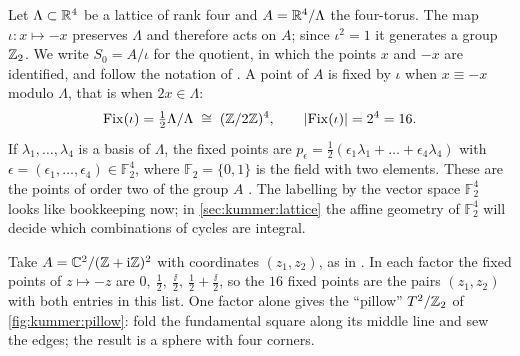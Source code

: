 Let $\Lambda\subset\mathbb{R}^4$ be a lattice of rank four and $A=\mathbb{R}^4/\Lambda$ the four-torus. The map
$\iota\colon x\mapsto -x$ preserves $\Lambda$ and therefore acts on $A$; since
$\iota^2=1$ it generates a group $\mathbb{Z}_2$. We write $S_0=A/\iota$ for the quotient, in which the
points $x$ and $-x$ are identified, and follow the notation of . A point of $A$ is fixed by $\iota$ when $x\equiv-x$ modulo $\Lambda$, that is
when $2x\in\Lambda$:
\begin{equation}\label{eq:kummer:fixed}
  \mathrm{Fix}(\iota)=\tfrac12\Lambda/\Lambda\;\cong\;(\mathbb{Z}/2\mathbb{Z})^4 ,\qquad
  |\mathrm{Fix}(\iota)|=2^4=16 .
\end{equation}
If $\lambda_1,\dots,\lambda_4$ is a basis of $\Lambda$, the fixed points are
$p_\epsilon=\frac12(\epsilon_1\lambda_1+\dots+\epsilon_4\lambda_4)$ with
$\epsilon=(\epsilon_1,\dots,\epsilon_4)\in\mathbb{F}_2^4$, where $\mathbb{F}_2=\{0,1\}$ is the
field with two elements. These are the points of order two of the group $A$
. The labelling by the vector space
$\mathbb{F}_2^4$ looks like bookkeeping now; in
\cref{sec:kummer:lattice} the affine geometry of $\mathbb{F}_2^4$ will decide which
combinations of cycles are integral.

\begin{example}\label{ex:kummer:square}
Take $A=\mathbb{C}^2/(\mathbb{Z}+\mathrm{i}\mathbb{Z})^2$ with coordinates $(z_1,z_2)$, as in . In each factor the fixed points of $z\mapsto-z$ are
$0,\ \frac12,\ \frac{\ii}2,\ \frac12+\frac{\ii}2$, so the $16$ fixed points are the pairs
$(z_1,z_2)$ with both entries in this list. One factor alone gives the ``pillow''
$T^2/\mathbb{Z}_2$ of \cref{fig:kummer:pillow}: fold the fundamental square along its middle line and
sew the edges; the result is a sphere with four corners.
\end{example}

